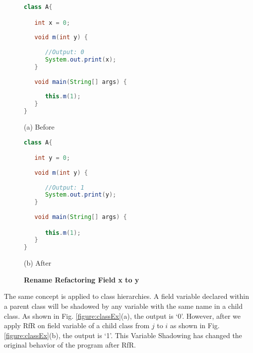 \begin{figure}[th]
\centering
\begin{minipage}[t]{0.47\linewidth}
\begin{lstlisting}[language=java, basicstyle=\scriptsize\ttfamily,frame=single]
class A{

   int x = 0;
	
   void m(int y) {
	
      //Output: 0
      System.out.print(x);
   }
	
   void main(String[] args) {
	
      this.m(1);
   }
}

\end{lstlisting}
\centering(a) Before
\end{minipage}
\hfill
\begin{minipage}[t]{0.47\linewidth}
\begin{lstlisting}[language=java, basicstyle=\scriptsize\ttfamily,frame=single]
class A{

   int y = 0;
	
   void m(int y) {
	
      //Output: 1
      System.out.print(y);
   }
	
   void main(String[] args) {

      this.m(1);
   }
}
\end{lstlisting}
\centering(b) After
\end{minipage}
\caption{\textbf{Rename Refactoring Field x to y}}
\label{figure:sameBlock}
\end{figure}

The same concept is applied to class hierarchies. A field variable declared within a parent class will be shadowed by any variable with the same name in a child class. As shown in Fig. \ref{figure:classEx}(a), the output is `0'. However, after we apply RfR on field variable of a child class from $j$ to $i$ as shown in Fig. \ref{figure:classEx}(b), the output is `1'. This Variable Shadowing has changed the original behavior of the program after RfR. 

